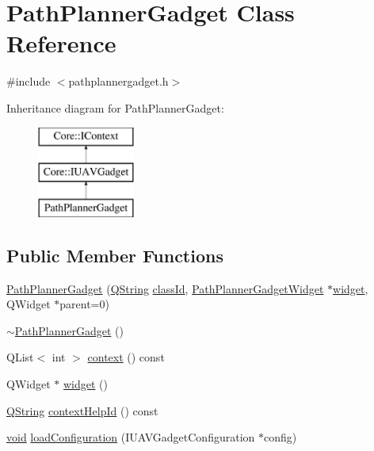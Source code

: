 \hypertarget{class_path_planner_gadget}{\section{\-Path\-Planner\-Gadget \-Class \-Reference}
\label{class_path_planner_gadget}
}


{\ttfamily \#include $<$pathplannergadget.\-h$>$}

\-Inheritance diagram for \-Path\-Planner\-Gadget\-:\begin{figure}[H]
\begin{center}
\leavevmode
\includegraphics[height=3.000000cm]{class_path_planner_gadget}
\end{center}
\end{figure}
\subsection*{\-Public \-Member \-Functions}
\begin{DoxyCompactItemize}
\item 
\hyperlink{group___path_planner_gadget_plugin_gac805c31521687b90ca55ae17a24e2cb0}{\-Path\-Planner\-Gadget} (\hyperlink{group___u_a_v_objects_plugin_gab9d252f49c333c94a72f97ce3105a32d}{\-Q\-String} \hyperlink{group___core_plugin_ga3878fde66a57220608960bcc3fbeef2c}{class\-Id}, \hyperlink{class_path_planner_gadget_widget}{\-Path\-Planner\-Gadget\-Widget} $\ast$\hyperlink{group___path_planner_gadget_plugin_ga4a83272b91f2a0359dfb4d3d950c6ae4}{widget}, \-Q\-Widget $\ast$parent=0)
\item 
\hyperlink{group___path_planner_gadget_plugin_ga6531735ac3658c46d3d3dd5ddd539f58}{$\sim$\-Path\-Planner\-Gadget} ()
\item 
\-Q\-List$<$ int $>$ \hyperlink{group___path_planner_gadget_plugin_ga6c2bd0fcf98faa6389c96a15430723d7}{context} () const 
\item 
\-Q\-Widget $\ast$ \hyperlink{group___path_planner_gadget_plugin_ga4a83272b91f2a0359dfb4d3d950c6ae4}{widget} ()
\item 
\hyperlink{group___u_a_v_objects_plugin_gab9d252f49c333c94a72f97ce3105a32d}{\-Q\-String} \hyperlink{group___path_planner_gadget_plugin_ga214a421178941f98f54bd3588c1634bc}{context\-Help\-Id} () const 
\item 
\hyperlink{group___u_a_v_objects_plugin_ga444cf2ff3f0ecbe028adce838d373f5c}{void} \hyperlink{group___path_planner_gadget_plugin_ga7606029076dafbc5e187ffeea2cbfdac}{load\-Configuration} (\-I\-U\-A\-V\-Gadget\-Configuration $\ast$config)
\end{DoxyCompactItemize}


